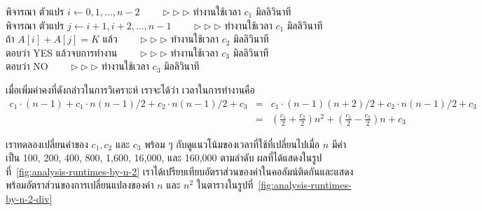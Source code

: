 \begin{algt}
\noindent \hspace*{0.2in} พิจารณา ตัวแปร $i\leftarrow 0,1,\ldots,n-2$   \ \ \ \ $\rhd\rhd\rhd$ ทำงาน{\wbr}ใช้เวลา $c_1$ มิ{\wbr}ลลิ{\wbr}วินาที\\
\hspace*{0.2in}\hspace*{0.2in} พิจารณา ตัวแปร $j\leftarrow i+1,i+2,\ldots,n-1$   \ \ \ \ $\rhd\rhd\rhd$ ทำงาน{\wbr}ใช้เวลา $c_1$ มิ{\wbr}ลลิ{\wbr}วินาที\\
\hspace*{0.2in}\hspace*{0.2in}\hspace*{0.2in} ถ้า $A[i] + A[j] = K$ แล้ว   \ \ \ \ $\rhd\rhd\rhd$ ทำงาน{\wbr}ใช้เวลา $c_2$ มิ{\wbr}ลลิ{\wbr}วินาที\\
\hspace*{0.2in}\hspace*{0.2in}\hspace*{0.2in}\hspace*{0.2in} ตอบ{\wbr}ว่า YES แล้ว{\wbr}จบ{\wbr}การ{\wbr}ทำงาน   \ \ \ \ $\rhd\rhd\rhd$ ทำงาน{\wbr}ใช้เวลา $c_3$ มิ{\wbr}ลลิ{\wbr}วินาที\\
\hspace*{0.2in} ตอบ{\wbr}ว่า NO   \ \ \ \ $\rhd\rhd\rhd$ ทำงาน{\wbr}ใช้เวลา $c_3$ มิ{\wbr}ลลิ{\wbr}วินาที{\wbr}
\end{algt}

เมื่อ{\wbr}เพิ่ม{\wbr}ค่าคงที่{\wbr}ดังกล่าว{\wbr}ใน{\wbr}การ{\wbr}วิเคราะห์ เรา{\wbr}จะ{\wbr}ได้{\wbr}ว่า เวลา{\wbr}ใน{\wbr}การ{\wbr}ทำงาน{\wbr}คือ{\wbr}
\begin{eqnarray*}
c_1\cdot(n-1) + c_1\cdot n(n-1)/2 + c_2\cdot n(n-1)/2 + c_3 
&=& c_1\cdot(n-1)(n+2)/2 + c_2\cdot n(n-1)/2 + c_3\\
&=& 
\left(\frac{c_1}{2} + \frac{c_2}{2}\right)n^2 +
\left(\frac{c_1}{2} - \frac{c_2}{2}\right)n + c_3
\end{eqnarray*}

เรา{\wbr}ทดลอง{\wbr}เปลี่ยน{\wbr}ค่า{\wbr}ของ $c_1,c_2$ และ $c_3$ พร้อม ๆ
กับ{\wbr}ดู{\wbr}แนวโน้ม{\wbr}ของ{\wbr}เวลา{\wbr}ที่{\wbr}ใช้{\wbr}ที่{\wbr}เปลี่ยน{\wbr}ไป{\wbr}เมื่อ $n$ มี{\wbr}ค่า{\wbr}เป็น 100, 200, 400, 800, 1,600,
16,000, และ 160,000 ตาม{\wbr}ลำดับ{\wbr}
ผล{\wbr}ที่{\wbr}ได้{\wbr}แสดง{\wbr}ใน{\wbr}รูป{\wbr}ที่~\ref{fig:analysis-runtimes-by-n-2}
เรา{\wbr}ได้{\wbr}เปรียบเทียบ{\wbr}อัตราส่วน{\wbr}ของ{\wbr}ค่า{\wbr}ใน{\wbr}คอลัมน์{\wbr}ติด{\wbr}กัน{\wbr}และ{\wbr}แสดง{\wbr}พร้อม{\wbr}อัตราส่วน{\wbr}ของ{\wbr}การ{\wbr}เปลี่ยนแปลง{\wbr}ของ{\wbr}ค่า{\wbr}
$n$ และ $n^2$ ใน{\wbr}ตาราง{\wbr}ใน{\wbr}รูป{\wbr}ที่~\ref{fig:analysis-runtimes-by-n-2-div}

